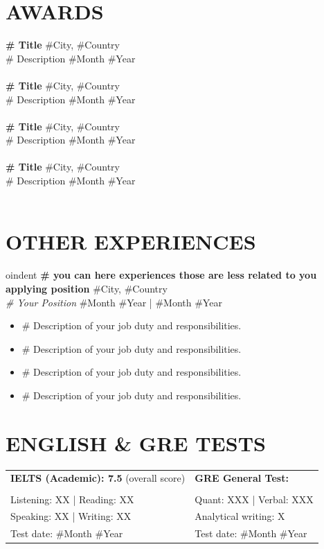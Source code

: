 \documentclass[a4paper,9pt]{extarticle}
\begin{document}
\section*{AWARDS}
\textbf{\# Title}  \hfill \#City, \#Country\\ 
\# Description \hfill \#Month \#Year\\ \\
\textbf{\# Title}  \hfill \#City, \#Country\\ 
\# Description \hfill \#Month \#Year\\ \\
\textbf{\# Title}  \hfill \#City, \#Country\\ 
\# Description \hfill \#Month \#Year\\ \\
\textbf{\# Title}  \hfill \#City, \#Country\\ 
\# Description \hfill \#Month \#Year\\ \\

\section*{OTHER EXPERIENCES}

oindent
\textbf{\# you can here experiences those are less related to you applying position}  \hfill \#City, \#Country\\ %
\textit{\# Your Position} \hfill \#Month \#Year | \#Month \#Year %
\begin{itemize}
    \item \# Description of your job duty and responsibilities.
    \item \# Description of your job duty and responsibilities.
    \item \# Description of your job duty and responsibilities.
    \item \# Description of your job duty and responsibilities.
\end{itemize}


\section*{ENGLISH \& GRE TESTS}
    \begin{tabularx}{1\textwidth}{
    >{\raggedright\arraybackslash}X 
   >{\raggedright\arraybackslash}X }
      \textbf{IELTS (Academic): 7.5} (overall score)&   \textbf{GRE General Test:}\\ \\
    Listening: XX | Reading: XX & Quant: XXX | Verbal: XXX\\
    Speaking: XX   | Writing: XX& Analytical writing: X\\
    Test date: \#Month \#Year &Test date: \#Month \#Year
    \end{tabularx}
\end{document}
